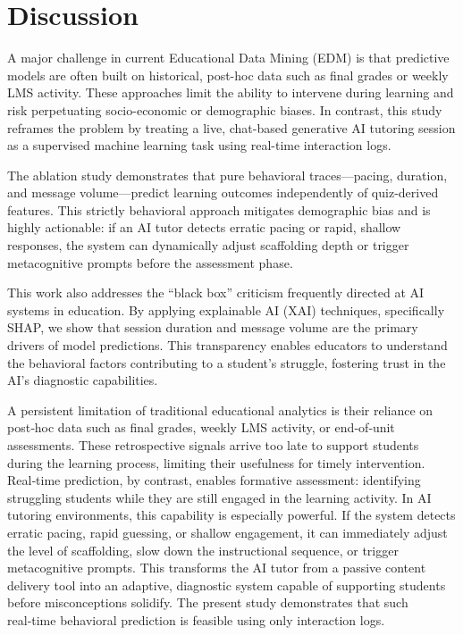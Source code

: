 \documentclass[conference]{IEEEtran}
\begin{document}
\section{Discussion}


A major challenge in current Educational Data Mining (EDM) is that predictive models are often built on historical, post-hoc data such as final grades or weekly LMS activity. These approaches limit the ability to intervene during learning and risk perpetuating socio-economic or demographic biases. In contrast, this study reframes the problem by treating a live, chat-based generative AI tutoring session as a supervised machine learning task using real-time interaction logs.

The ablation study demonstrates that pure behavioral traces—pacing, duration, and message volume—predict learning outcomes independently of quiz-derived features. This strictly behavioral approach mitigates demographic bias and is highly actionable: if an AI tutor detects erratic pacing or rapid, shallow responses, the system can dynamically adjust scaffolding depth or trigger metacognitive prompts before the assessment phase.

This work also addresses the ``black box'' criticism frequently directed at AI systems in education. By applying explainable AI (XAI) techniques, specifically SHAP, we show that session duration and message volume are the primary drivers of model predictions. This transparency enables educators to understand the behavioral factors contributing to a student's struggle, fostering trust in the AI's diagnostic capabilities.

A persistent limitation of traditional educational analytics is their reliance on post‑hoc data such as final grades, weekly LMS activity, or end‑of‑unit assessments. These retrospective signals arrive too late to support students during the learning process, limiting their usefulness for timely intervention. Real‑time prediction, by contrast, enables formative assessment: identifying struggling students while they are still engaged in the learning activity. In AI tutoring environments, this capability is especially powerful. If the system detects erratic pacing, rapid guessing, or shallow engagement, it can immediately adjust the level of scaffolding, slow down the instructional sequence, or trigger metacognitive prompts. This transforms the AI tutor from a passive content delivery tool into an adaptive, diagnostic system capable of supporting students before misconceptions solidify. The present study demonstrates that such real‑time behavioral prediction is feasible using only interaction logs.
\end{document}
